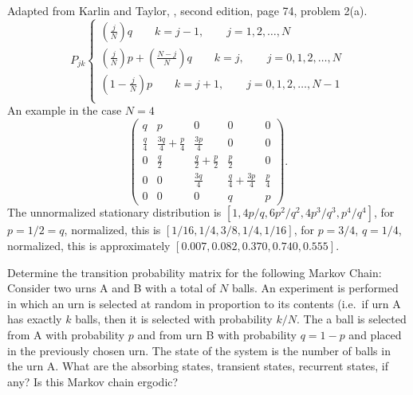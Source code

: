 \documentclass[12pt]{article}
\begin{document}
\begin{solution}
    Adapted from Karlin and Taylor, , second edition, page 74, problem 2(a).
    \[
        P_{jk}
        \begin{cases}
            \left( \frac{j}{N}\right)q \qquad k = j-1, \qquad j=1,2,\dots,N
            \\
            \left( \frac{j}{N} \right) p + \left( \frac{N-j}{N} \right)
            q \qquad k = j, \qquad j=0,1,2,\dots,N \\
            \left( 1- \frac{j}{N} \right) p \qquad k = j+1, \qquad
            j=0,1,2,\dots,N-1 \\
        \end{cases}
    \] An example in the case \( N=4 \)
    \[
        \begin{pmatrix}
            q & p & 0 & 0 & 0\\
            \frac{q}{4} & \frac{3q}{4}+\frac{p}{4} & \frac{3p}{4} & 0 &
            0\\
            0 & \frac{q}{2} & \frac{q}{2}+\frac{p}{2} & \frac{p}{2} & 0\\
            0 & 0 & \frac{3q}{4} & \frac{q}{4}+\frac{3p}{4} & \frac{p}{4}\\
            0 & 0 & 0 & q & p
        \end{pmatrix}
        .
    \] The unnormalized stationary distribution is \( [1, 4p/q, 6p^2/q^2,
    4p^3/q^3, p^4/q^4 ] \), for \( p = 1/2 = q \), normalized, this is \(
    [ 1/16, 1/4, 3/8, 1/4, 1/16] \), for \( p =3/4 \), \( q = 1/4 \),
    normalized, this is approximately \( [0.007, 0.082, 0.370, 0.740,
    0.555] \).
\end{solution}
\begin{exercise}
    Determine the transition probability matrix for the following Markov
    Chain:  Consider two urns A and B with a total of \( N \) balls.  An
    experiment is performed in which an urn is selected at random in
    proportion to its contents (i.e.\ if urn A has exactly \( k \)
    balls, then it is selected with probability \( k/N \). The a ball is
    selected from A with probability \( p \) and from urn B with
    probability \( q = 1-p \) and placed in the previously chosen urn.
    The state of the system is the number of balls in the urn A. What
    are the absorbing states, transient states, recurrent states, if
    any?  Is this Markov chain ergodic?
\end{exercise}
\end{document}
